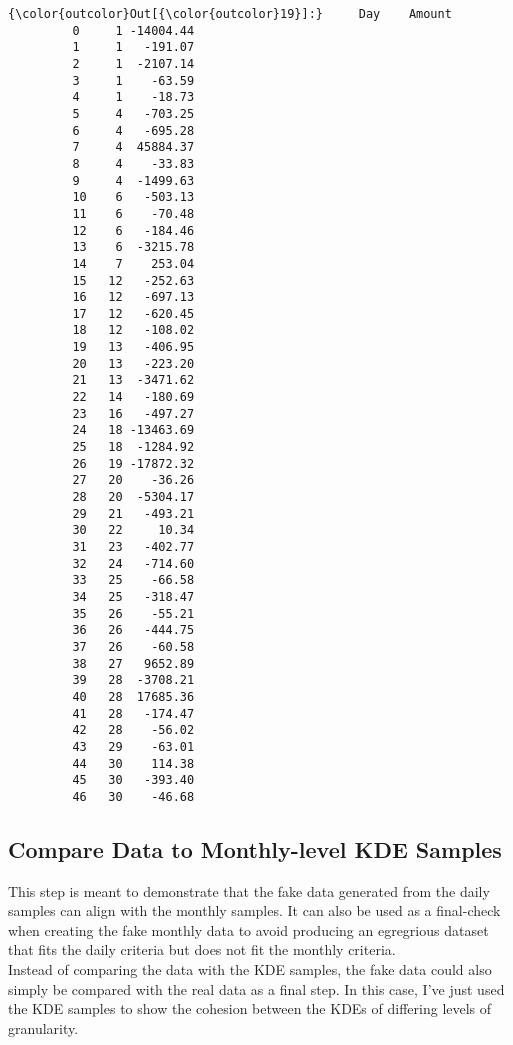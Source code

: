 \documentclass[11pt]{article}
\begin{document}
\begin{Verbatim}[commandchars=\\\{\}]
{\color{outcolor}Out[{\color{outcolor}19}]:}     Day    Amount
         0     1 -14004.44
         1     1   -191.07
         2     1  -2107.14
         3     1    -63.59
         4     1    -18.73
         5     4   -703.25
         6     4   -695.28
         7     4  45884.37
         8     4    -33.83
         9     4  -1499.63
         10    6   -503.13
         11    6    -70.48
         12    6   -184.46
         13    6  -3215.78
         14    7    253.04
         15   12   -252.63
         16   12   -697.13
         17   12   -620.45
         18   12   -108.02
         19   13   -406.95
         20   13   -223.20
         21   13  -3471.62
         22   14   -180.69
         23   16   -497.27
         24   18 -13463.69
         25   18  -1284.92
         26   19 -17872.32
         27   20    -36.26
         28   20  -5304.17
         29   21   -493.21
         30   22     10.34
         31   23   -402.77
         32   24   -714.60
         33   25    -66.58
         34   25   -318.47
         35   26    -55.21
         36   26   -444.75
         37   26    -60.58
         38   27   9652.89
         39   28  -3708.21
         40   28  17685.36
         41   28   -174.47
         42   28    -56.02
         43   29    -63.01
         44   30    114.38
         45   30   -393.40
         46   30    -46.68
\end{Verbatim}
            
    \subsection{Compare Data to Monthly-level KDE Samples}

This step is meant to demonstrate that the fake data generated from the
daily samples can align with the monthly samples. It can also be used as
a final-check when creating the fake monthly data to avoid producing an
egregrious dataset that fits the daily criteria but does not fit the
monthly criteria.\\

Instead of comparing the data with the KDE samples, the fake data could
also simply be compared with the real data as a final step. In this
case, I've just used the KDE samples to show the cohesion between the
KDEs of differing levels of granularity.\\
\end{document}
